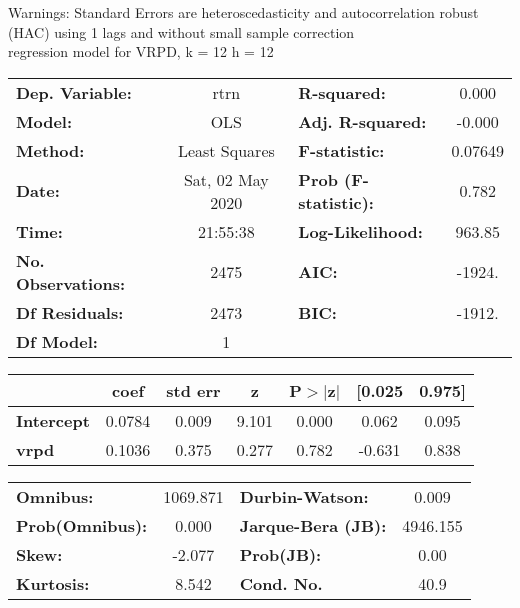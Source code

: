 Warnings: \newline
 [1] Standard Errors are heteroscedasticity and autocorrelation robust (HAC) using 1 lags and without small sample correction\\ 

regression model for VRPD, k = 12 h = 12\begin{center}
\begin{tabular}{lclc}
\toprule
\textbf{Dep. Variable:}    &       rtrn       & \textbf{  R-squared:         } &     0.000   \\
\textbf{Model:}            &       OLS        & \textbf{  Adj. R-squared:    } &    -0.000   \\
\textbf{Method:}           &  Least Squares   & \textbf{  F-statistic:       } &   0.07649   \\
\textbf{Date:}             & Sat, 02 May 2020 & \textbf{  Prob (F-statistic):} &    0.782    \\
\textbf{Time:}             &     21:55:38     & \textbf{  Log-Likelihood:    } &    963.85   \\
\textbf{No. Observations:} &        2475      & \textbf{  AIC:               } &    -1924.   \\
\textbf{Df Residuals:}     &        2473      & \textbf{  BIC:               } &    -1912.   \\
\textbf{Df Model:}         &           1      & \textbf{                     } &             \\
\bottomrule
\end{tabular}
\begin{tabular}{lcccccc}
                   & \textbf{coef} & \textbf{std err} & \textbf{z} & \textbf{P$> |$z$|$} & \textbf{[0.025} & \textbf{0.975]}  \\
\midrule
\textbf{Intercept} &       0.0784  &        0.009     &     9.101  &         0.000        &        0.062    &        0.095     \\
\textbf{vrpd}      &       0.1036  &        0.375     &     0.277  &         0.782        &       -0.631    &        0.838     \\
\bottomrule
\end{tabular}
\begin{tabular}{lclc}
\textbf{Omnibus:}       & 1069.871 & \textbf{  Durbin-Watson:     } &    0.009  \\
\textbf{Prob(Omnibus):} &   0.000  & \textbf{  Jarque-Bera (JB):  } & 4946.155  \\
\textbf{Skew:}          &  -2.077  & \textbf{  Prob(JB):          } &     0.00  \\
\textbf{Kurtosis:}      &   8.542  & \textbf{  Cond. No.          } &     40.9  \\
\bottomrule
\end{tabular}
\end{center}

